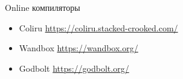 \documentclass{beamer}
\begin{document}
\begin{frame}{Online компиляторы}
\begin{itemize}
  \item Coliru  \href{https://coliru.stacked-crooked.com/}{https://coliru.stacked-crooked.com/} \vspace{3em}
  \item Wandbox  \href{https://wandbox.org/}{https://wandbox.org/} \vspace{3em}
  \item Godbolt  \href{https://godbolt.org/}{https://godbolt.org/} \vspace{3em}
\end{itemize}
\end{frame}
\end{document}
